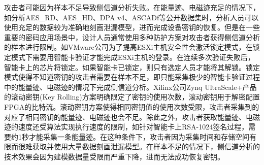 {	攻击者可能因为样本不足导致侧信道分析失败。在能量迹、电磁迹充足的情况下，如分析AES\_RD\citep{AESRD}、AES\_HD\citep{AESHD}、DPA v4\citep{dpav4}、ASCADf\citep{Benadjila20}等公开数据集时，分析人员可以使用充足的数据较为准确地刻画泄漏模型，进而完成设备密钥的恢复。但是在一些重要的密码应用场景中，设计人员通常使用多种防护方案对攻击者获得侧信道分析的样本进行限制。如VMware公司为了提高ESXi主机安全性会激活锁定模式，在锁定模式下需要用智能卡验证才能完成ESXi主机的登录。在连续多次验证失败后，智能卡上的芯片将锁定。如果智能卡已锁定，则只有选定人员才能将其解锁\citep{GUID-04636353-4A11-4874-9D59-7F4F4E5CF1F}。锁定模式使得不知道密钥的攻击者需要在样本不足，即只能采集极少的智能卡验证过程中的能量迹、电磁迹的情况下完成侧信道分析。Xilinx公司Zynq UltraScale+产品的滚动密钥(Key Rolling)方案明确限定了密钥的使用次数\citep{UG1085}，滚动密钥用于解密配置FPGA的比特流。滚动密钥方案使得相同密钥值的使用次数受限，攻击者采集到的对应了相同密钥的能量迹、电磁迹也会不足。除此之外，攻击者获取能量迹、电磁迹的速度还受算法实现执行速度的限制，如针对智能卡上RSA-1024签名过程，需要约1秒才能采集一条能量迹。在这种条件下，攻击者因为采集时间和存储空间有限而很难获取并使用大量数据刻画泄漏模型。在样本不足的情况下，侧信道分析的技术效果会因为建模数据量受限而严重下降，进而无法成功恢复密钥。%
	
	
}
